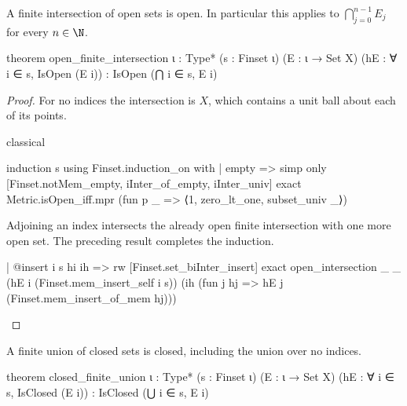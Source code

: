 \begin{proposition}
  \label{ma:thm:finite-intersection-of-open-sets-is-open}
  A finite intersection of open sets is open.
  In particular this applies to $\bigcap_{j=0}^{n-1}E_j$ for every $n\in\N$.

  \begin{lean}
    theorem open_finite_intersection {ι : Type*} (s : Finset ι)
        (E : ι → Set X) (hE : ∀ i ∈ s, IsOpen (E i)) :
        IsOpen (⋂ i ∈ s, E i)
  \end{lean}
\end{proposition}

\begin{proof}
  For no indices the intersection is $X$, which contains a unit ball about each of its points.

  \begin{lean}
    classical

    induction s using Finset.induction_on with
    | empty =>
      simp only [Finset.notMem_empty, iInter_of_empty, iInter_univ]
      exact Metric.isOpen_iff.mpr (fun p _ => ⟨1, zero_lt_one, subset_univ _⟩)
  \end{lean}

  Adjoining an index intersects the already open finite intersection with one more open set.
  The preceding result completes the induction.

  \begin{lean}
    | @insert i s hi ih =>
      rw [Finset.set_biInter_insert]
      exact open_intersection _ _ (hE i (Finset.mem_insert_self i s))
        (ih (fun j hj => hE j (Finset.mem_insert_of_mem hj)))
  \end{lean}
\end{proof}

\begin{corollary}
  \label{ma:cor:finite-union-of-closed-sets-is-closed}
  A finite union of closed sets is closed, including the union over no indices.

  \begin{lean}
    theorem closed_finite_union {ι : Type*} (s : Finset ι)
        (E : ι → Set X) (hE : ∀ i ∈ s, IsClosed (E i)) :
        IsClosed (⋃ i ∈ s, E i)
  \end{lean}
\end{corollary}

